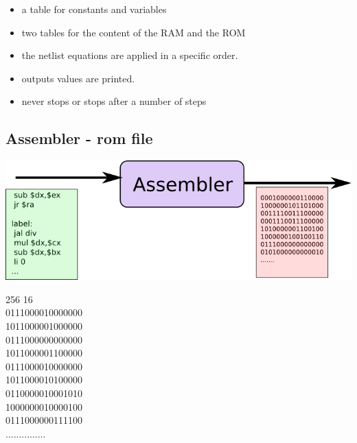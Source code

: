 \documentclass[c]{beamer}
\begin{document}
\begin{frame}
\begin{itemize}
\item a table for constants and variables
\newline
\item two tables for the content of the RAM and the ROM
\newline
\item the netlist equations are applied in a specific order.
\newline
\item outputs values are printed.
\newline
\item never stops or stops after a number of steps
\end{itemize}
\end{frame}


\subsection{Assembler - rom file}

\begin{frame}
\includegraphics[scale = 0.5]{assembler.png}
%
\end{frame}

\begin{frame}
256 16 \\
0111000010000000 \\
1011000001000000 \\
0111000000000000 \\
1011000001100000 \\
0111000010000000 \\
1011000010100000 \\
0110000010001010 \\
1000000010000100 \\
0111000000111100 \\
...............
\end{frame}
\end{document}
